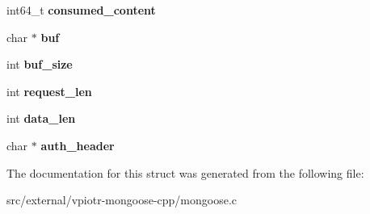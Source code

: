 \begin{DoxyCompactItemize}
\item 
\hypertarget{structmg__connection_a271e16e618bd9265577aef7ef5ed637d}{int64\-\_\-t {\bfseries consumed\-\_\-content}}\label{structmg__connection_a271e16e618bd9265577aef7ef5ed637d}

\item 
\hypertarget{structmg__connection_a897c2cf854e4ad76856bad74fb8e7f0a}{char $\ast$ {\bfseries buf}}\label{structmg__connection_a897c2cf854e4ad76856bad74fb8e7f0a}

\item 
\hypertarget{structmg__connection_a6033a47c6e89ad571ca65000ab53f07e}{int {\bfseries buf\-\_\-size}}\label{structmg__connection_a6033a47c6e89ad571ca65000ab53f07e}

\item 
\hypertarget{structmg__connection_a31dff43ab95d3d5e6dde9eb95460fd97}{int {\bfseries request\-\_\-len}}\label{structmg__connection_a31dff43ab95d3d5e6dde9eb95460fd97}

\item 
\hypertarget{structmg__connection_aa88754208d93c23d110469696d935bdc}{int {\bfseries data\-\_\-len}}\label{structmg__connection_aa88754208d93c23d110469696d935bdc}

\item 
\hypertarget{structmg__connection_a46f96ad94890d3ecd1be9859cfe3abfe}{char $\ast$ {\bfseries auth\-\_\-header}}\label{structmg__connection_a46f96ad94890d3ecd1be9859cfe3abfe}

\end{DoxyCompactItemize}


The documentation for this struct was generated from the following file\-:\begin{DoxyCompactItemize}
\item 
src/external/vpiotr-\/mongoose-\/cpp/mongoose.\-c\end{DoxyCompactItemize}
